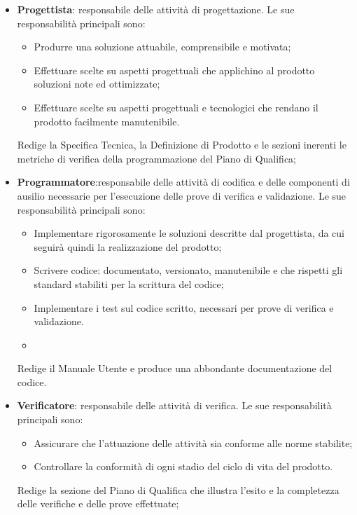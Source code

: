 \begin{itemize}
			\item \textbf{Progettista}: responsabile delle attività di progettazione.
			Le sue responsabilità principali sono:			
			\begin{itemize}
				\item Produrre una soluzione attuabile, comprensibile e motivata;
				\item Effettuare scelte su aspetti progettuali che applichino al prodotto soluzioni note ed ottimizzate;
				\item Effettuare scelte su aspetti progettuali e tecnologici che rendano il prodotto facilmente manutenibile.
			\end{itemize}
			Redige la Specifica Tecnica, la Definizione di Prodotto e le sezioni inerenti le metriche di verifica della programmazione del Piano di Qualifica; 
		
			\item \textbf{Programmatore}:responsabile delle attività di codifica e delle componenti di ausilio necessarie per l’esecuzione delle prove di verifica e validazione.
			Le sue responsabilità principali sono:			
			\begin{itemize}
				\item Implementare rigorosamente le soluzioni descritte dal progettista, da cui seguirà quindi la realizzazione del prodotto;
				\item Scrivere codice: documentato, versionato, manutenibile e che rispetti gli standard stabiliti per la scrittura del codice;
				\item Implementare i test sul codice scritto, necessari per prove di verifica e validazione.\item 
			\end{itemize}
			Redige il Manuale Utente e produce una abbondante documentazione del codice.
		
			\item \textbf{Verificatore}: responsabile delle attività di verifica.
			Le sue responsabilità principali sono:			
			\begin{itemize}
				\item Assicurare che l’attuazione delle attività sia conforme alle norme stabilite;
				\item Controllare la conformità di ogni stadio del ciclo di vita del prodotto.
			\end{itemize}
			Redige la sezione del Piano di Qualifica che illustra l’esito e la completezza delle verifiche e delle prove effettuate;

		\end{itemize}
	
